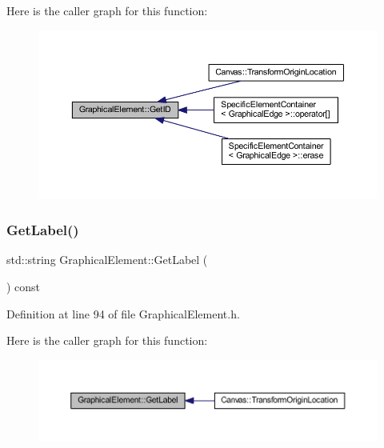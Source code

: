 Here is the caller graph for this function\+:
\nopagebreak
\begin{figure}[H]
\begin{center}
\leavevmode
\includegraphics[width=350pt]{class_graphical_element_a09ed630bc819c852f96ed20dda8d84e8_icgraph}
\end{center}
\end{figure}
\mbox{\label{class_graphical_element_a82ab7426dc354b2a91bf0ccc0a34b0b3}} 
\subsubsection{\texorpdfstring{Get\+Label()}{GetLabel()}}
{\footnotesize\ttfamily std\+::string Graphical\+Element\+::\+Get\+Label (\begin{DoxyParamCaption}{ }\end{DoxyParamCaption}) const\hspace{0.3cm}{\ttfamily [inline]}}



Definition at line 94 of file Graphical\+Element.\+h.

Here is the caller graph for this function\+:
\nopagebreak
\begin{figure}[H]
\begin{center}
\leavevmode
\includegraphics[width=350pt]{class_graphical_element_a82ab7426dc354b2a91bf0ccc0a34b0b3_icgraph}
\end{center}
\end{figure}
\mbox{\label{class_graphical_element_a28c3cdbdfa3f295f6afaf463ba3e6157}} 
